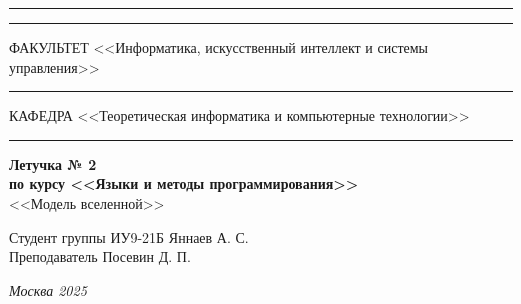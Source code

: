 \documentclass[a4paper, 14pt]{extarticle}
\begin{document}
\begin{titlepage}
\vspace{-25pt}
\hspace{-35pt}\rule{\textwidth}{2.3pt}

\vspace*{-20.3pt}
\hspace{-35pt}\rule{\textwidth}{0.4pt}

\vspace{1.5ex}
\hspace{-35pt} \noindent \small ФАКУЛЬТЕТ\hspace{30pt} <<Информатика, искусственный интеллект и системы управления>>

\vspace*{-16pt}
\hspace{47pt}\rule{0.83\textwidth}{0.4pt}

\vspace{0.5ex}
\hspace{-35pt} \noindent \small КАФЕДРА\hspace{50pt} <<Теоретическая информатика и компьютерные технологии>>

\vspace*{-16pt}
\hspace{30pt}\rule{0.866\textwidth}{0.4pt}

\vspace{11em}

\begin{center}
\Large {\bf Летучка  № 2} \\
\large {\bf по курсу <<Языки и методы программирования>>} \\
\large <<Модель вселенной>>
\end{center}\normalsize

\vspace{8em}


\begin{flushright}
  {Студент группы ИУ9-21Б Яннаев А. С. \hspace*{15pt}\\
  \vspace{2ex}
  Преподаватель Посевин Д. П.\hspace*{15pt}}
\end{flushright}

\bigskip

\vfill


\begin{center}
\textsl{Москва 2025}
\end{center}
\end{titlepage}
\end{document}

